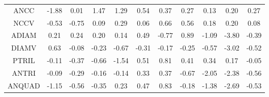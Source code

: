 \documentclass[11pt,a4paper]{report}
\begin{document}
\begin{longtable}{ | c || c | c | c | c | c | c | c | c | c || c |}
ANCC &  \cellcolor[HTML]{FFCFCF} -1.88 &  \cellcolor[HTML]{FFFFFF} 0.01 &  \cellcolor[HTML]{D7D7FF} 1.47 &  \cellcolor[HTML]{DFDFFF} 1.29 &  \cellcolor[HTML]{EFEFFF} 0.54 &  \cellcolor[HTML]{F7F7FF} 0.37 &  \cellcolor[HTML]{F7F7FF} 0.27 &  \cellcolor[HTML]{FFFFFF} 0.13 &  \cellcolor[HTML]{F7F7FF} 0.20 &  \cellcolor[HTML]{F7F7FF} 0.27 \\
NCCV &  \cellcolor[HTML]{FFEFEF} -0.53 &  \cellcolor[HTML]{FFEFEF} -0.75 &  \cellcolor[HTML]{FFFFFF} 0.09 &  \cellcolor[HTML]{F7F7FF} 0.29 &  \cellcolor[HTML]{FFFFFF} 0.06 &  \cellcolor[HTML]{EFEFFF} 0.66 &  \cellcolor[HTML]{EFEFFF} 0.56 &  \cellcolor[HTML]{F7F7FF} 0.18 &  \cellcolor[HTML]{F7F7FF} 0.20 &  \cellcolor[HTML]{FFFFFF} 0.08 \\
ADIAM &  \cellcolor[HTML]{F7F7FF} 0.21 &  \cellcolor[HTML]{F7F7FF} 0.24 &  \cellcolor[HTML]{F7F7FF} 0.20 &  \cellcolor[HTML]{FFFFFF} 0.14 &  \cellcolor[HTML]{EFEFFF} 0.49 &  \cellcolor[HTML]{FFEFEF} -0.77 &  \cellcolor[HTML]{E7E7FF} 0.89 &  \cellcolor[HTML]{FFE7E7} -1.09 &  \cellcolor[HTML]{FF9F9F} -3.80 &  \cellcolor[HTML]{FFF7F7} -0.39 \\
DIAMV &  \cellcolor[HTML]{EFEFFF} 0.63 &  \cellcolor[HTML]{FFFFFF} -0.08 &  \cellcolor[HTML]{FFF7F7} -0.23 &  \cellcolor[HTML]{FFEFEF} -0.67 &  \cellcolor[HTML]{FFF7F7} -0.31 &  \cellcolor[HTML]{FFF7F7} -0.17 &  \cellcolor[HTML]{FFF7F7} -0.25 &  \cellcolor[HTML]{FFEFEF} -0.57 &  \cellcolor[HTML]{FFAFAF} -3.02 &  \cellcolor[HTML]{FFEFEF} -0.52 \\
PTRIL &  \cellcolor[HTML]{FFFFFF} -0.11 &  \cellcolor[HTML]{FFF7F7} -0.37 &  \cellcolor[HTML]{FFEFEF} -0.66 &  \cellcolor[HTML]{FFD7D7} -1.54 &  \cellcolor[HTML]{EFEFFF} 0.51 &  \cellcolor[HTML]{E7E7FF} 0.81 &  \cellcolor[HTML]{F7F7FF} 0.41 &  \cellcolor[HTML]{F7F7FF} 0.34 &  \cellcolor[HTML]{F7F7FF} 0.17 &  \cellcolor[HTML]{FFFFFF} -0.05 \\
ANTRI &  \cellcolor[HTML]{FFFFFF} -0.09 &  \cellcolor[HTML]{FFF7F7} -0.29 &  \cellcolor[HTML]{FFF7F7} -0.16 &  \cellcolor[HTML]{FFFFFF} -0.14 &  \cellcolor[HTML]{F7F7FF} 0.33 &  \cellcolor[HTML]{F7F7FF} 0.37 &  \cellcolor[HTML]{FFEFEF} -0.67 &  \cellcolor[HTML]{FFCFCF} -2.05 &  \cellcolor[HTML]{FFC7C7} -2.38 &  \cellcolor[HTML]{FFEFEF} -0.56 \\
ANQUAD &  \cellcolor[HTML]{FFDFDF} -1.15 &  \cellcolor[HTML]{FFEFEF} -0.56 &  \cellcolor[HTML]{FFF7F7} -0.35 &  \cellcolor[HTML]{F7F7FF} 0.23 &  \cellcolor[HTML]{F7F7FF} 0.47 &  \cellcolor[HTML]{E7E7FF} 0.83 &  \cellcolor[HTML]{FFF7F7} -0.18 &  \cellcolor[HTML]{FFDFDF} -1.38 &  \cellcolor[HTML]{FFBFBF} -2.69 &  \cellcolor[HTML]{FFEFEF} -0.53 \\

\end{longtable}
\end{document}
